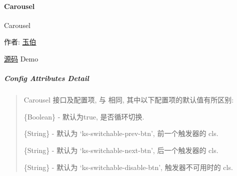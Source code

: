 \documentclass[letterpaper,10pt,english]{sphinxmanual}
\begin{document}
\paragraph{Carousel}
\label{api/component/switchable/carousel::doc}\label{api/component/switchable/carousel:carousel}
\begin{DUlineblock}{0em}
\item[] Carousel
\item[] 作者: \href{mailto:lifesinger@gmail.com}{玉伯}
\item[] \href{https://github.com/kissyteam/kissy/tree/master/src/switchable/carousel/}{源码} \textbar{} Demo
\end{DUlineblock}


\subparagraph{Config Attributes Detail}
\label{api/component/switchable/carousel:config-attributes-detail}\begin{quote}

Carousel 接口及配置项, 与 {\hyperref[api/component/switchable/switchable:module-Switchable]{}} 相同, 其中以下配置项的默认值有所区别:


\begin{fulllineitems}
\label{api/component/switchable/carousel:Carousel.circular}
\{Boolean\} - 默认为true, 是否循环切换.

\end{fulllineitems}



\begin{fulllineitems}
\label{api/component/switchable/carousel:Carousel.prevBtnCls}
\{String\} - 默认为 `ks-switchable-prev-btn', 前一个触发器的 cls.

\end{fulllineitems}



\begin{fulllineitems}
\label{api/component/switchable/carousel:Carousel.nextBtnCls}
\{String\} - 默认为 `ks-switchable-next-btn', 后一个触发器的 cls.

\end{fulllineitems}



\begin{fulllineitems}
\label{api/component/switchable/carousel:Carousel.disableBtnCls}
\{String\} - 默认为 `ks-switchable-disable-btn', 触发器不可用时的 cls.

\end{fulllineitems}

\end{quote}
\label{api/component/switchable/accordion:module-Accordion}
\end{document}
